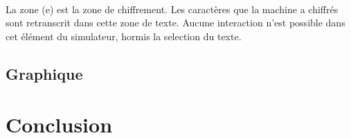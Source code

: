 \documentclass[letterpaper]{article}
\begin{document}
\paragraph{}

La zone (e) est la zone de chiffrement. Les caractères que la machine a chiffrés sont retranscrit dans cette zone de texte. Aucune interaction n'est possible dans cet élément du simulateur, hormis la selection du texte.

\subsection{Graphique}

\section{Conclusion}

\footnotesize


\end{document}
